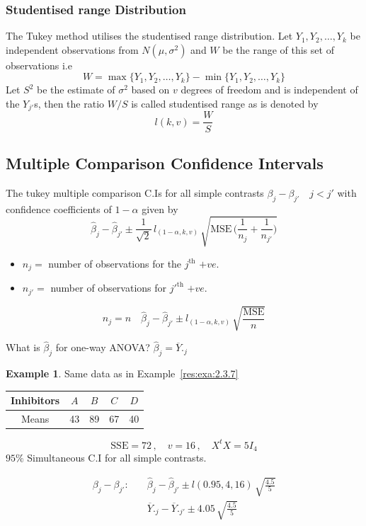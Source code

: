 \documentclass[11pt,a4paper]{article}
\theoremstyle{definition}
\newtheorem{exa}[thm]{Example}
\begin{document}
\subsubsection*{Studentised range Distribution}
The Tukey method utilises the studentised range distribution. Let $Y_1, Y_2,\ldots , Y_k$ be independent observations from $N(\mu,\sigma^2)$ and $W$ be the range of this set of  observations i.e $$W=\max\big\{Y_1,Y_2,\ldots ,Y_k\big\}-\min\big\{Y_1,Y_2,\ldots ,Y_k\big\}$$ Let $S^2$ be the estimate of $\sigma^2$ based on $v$ degrees of freedom and is independent of the $Y_{j'}$s, then the ratio $W/S$ is called studentised range as is denoted by $$l(k,v)=\frac{W}{S}$$


\subsection*{Multiple Comparison Confidence Intervals}
The tukey multiple comparison C.Is for all simple contrasts $\beta_j-\beta_{j'}\quad j<j'$ with confidence coefficients of $1-\alpha$ given by 
$$\widehat{\beta}_j-\widehat{\beta}_{j'}\pm \frac{1}{\sqrt{2}}\, l_{(1-\alpha,k,v)} \,\sqrt{\text{MSE}\,\Big(\frac{1}{n_j}+\frac{1}{n_{j'}}\Big)}$$
\begin{itemize}
\item[] $n_j=$ number of  observations for the $j^{\text{th}}$ $+ve$.
\item[] $n_{j'}=$ number of observations for $j'^{\text{th}}$ $+ve$.
\end{itemize}

$$n_j=n\quad  \widehat{\beta}_j-\widehat{\beta}_{j'} \pm l_{(1-\alpha,k,v)}\,\sqrt{\frac{\text{MSE}}{n}}$$


What is $\widehat{\beta}_j$ for one-way ANOVA? \quad $\widehat{\beta}_j=\overline{Y}._j$


\begin{exa}\label{res:exa:2.3.8}
Same data as in Example~\ref{res:exa:2.3.7}\\

\begin{table}[h!]
\centering
\begin{tabular}{c|cccc}
Inhibitors & $A$ & $B$ & $C$ & $D$\\
\hline
Means & 43 & 89 & 67 & 40\\
\end{tabular}
\end{table}

$$\text{SSE} = 72\, ,\quad  v=16\,, \quad  X^tX=5I_4$$
$95\%$ Simultaneous C.I for all simple contrasts.

\begin{align*}
\beta_j-\beta_{j'} :\quad  & \widehat{\beta}_j-\widehat{\beta}_{j'}\pm l(0.95,4,16)\,\sqrt{\frac{4.5}{5}}\\
                     & \overline{Y}._j-\overline{Y}._{j'}\pm 4.05\,\sqrt{\frac{4.5}{5}}\\
\end{align*}
\end{exa}
\end{document}

